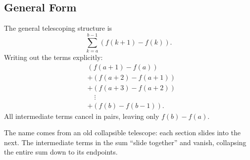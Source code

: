 \DefinitionalRoot

\subsection*{General Form}

\begin{exposition}
The general telescoping structure is
\[
\sum_{k=a}^{b-1} (f(k+1) - f(k)).
\]
Writing out the terms explicitly:
\[
\begin{aligned}
& (f(a+1)-f(a)) \\
& + (f(a+2)-f(a+1)) \\
& + (f(a+3)-f(a+2)) \\
& \quad \vdots \\
& + (f(b)-f(b-1)).
\end{aligned}
\]
All intermediate terms cancel in pairs, leaving only \(f(b) - f(a)\).
\end{exposition}

\begin{remark*}[Interpretation]
The name comes from an old collapsible telescope: each section slides
into the next. The intermediate terms in the sum ``slide together''
and vanish, collapsing the entire sum down to its endpoints.
\end{remark*}
